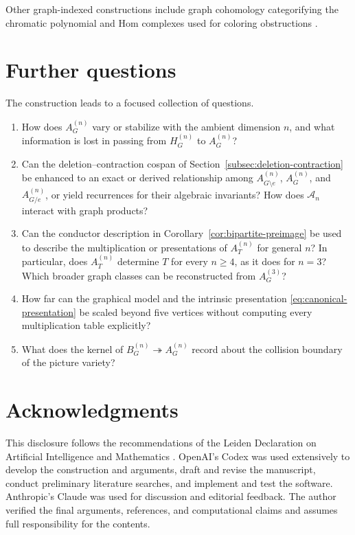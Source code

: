 \documentclass[11pt]{amsart}
\theoremstyle{plain}
\theoremstyle{definition}
\theoremstyle{remark}
\begin{document}
Other graph-indexed constructions include graph cohomology categorifying the
chromatic polynomial \cite{HelmeGuizonRong} and Hom complexes used for
coloring obstructions \cite{BabsonKozlov}.

\section{Further questions}

The construction leads to a focused collection of questions.
\begin{enumerate}
  \item How does $A_G^{(n)}$ vary or stabilize with the ambient dimension
  $n$, and what information is lost in passing from $H_G^{(n)}$ to
  $A_G^{(n)}$?
  \item Can the deletion--contraction cospan of
  Section~\ref{subsec:deletion-contraction} be enhanced to an exact or derived
  relationship among $A_{G\setminus e}^{(n)}$, $A_G^{(n)}$, and
  $A_{G/e}^{(n)}$, or yield recurrences for their algebraic invariants?  How
  does $\mathcal A_n$ interact with graph products?
  \item Can the conductor description in
  Corollary~\ref{cor:bipartite-preimage} be used to describe the
  multiplication or presentations of $A_T^{(n)}$ for general $n$?  In
  particular, does $A_T^{(n)}$ determine $T$ for every $n\geq 4$, as it does
  for $n=3$?  Which broader graph classes can be reconstructed from
  $A_G^{(3)}$?
  \item How far can the graphical model and the intrinsic presentation
  \eqref{eq:canonical-presentation} be scaled beyond five vertices without
  computing every multiplication table explicitly?
  \item What does the kernel of
  $B_G^{(n)}\twoheadrightarrow A_G^{(n)}$ record about the collision boundary
  of the picture variety?
\end{enumerate}

\section*{Acknowledgments}

This disclosure follows the recommendations of the Leiden Declaration on
Artificial Intelligence and Mathematics \cite{LeidenDeclaration}. OpenAI's
Codex was used extensively to develop the construction and arguments, draft and
revise the manuscript, conduct preliminary literature searches, and implement
and test the software. Anthropic's Claude was used for discussion and editorial
feedback. The author verified the final arguments, references, and computational
claims and assumes full responsibility for the contents.



\end{document}
